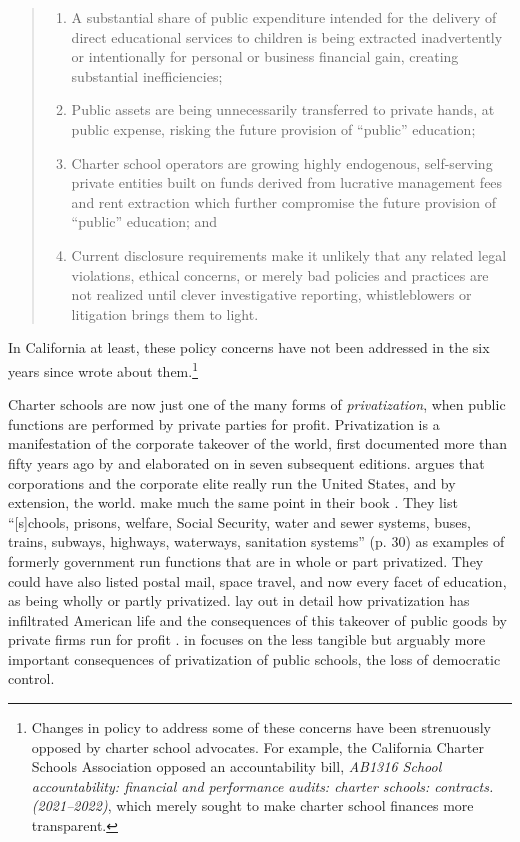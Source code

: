 \begin{quote}\OnehalfSpacing%
  \begin{enumerate}
    \item A substantial share of public expenditure intended for the delivery of direct educational services to children is being extracted inadvertently or intentionally for personal or business financial gain, creating substantial inefficiencies;
    \item Public assets are being unnecessarily transferred to private hands, at public expense, risking the future provision of “public” education;
    \item Charter school operators are growing highly endogenous, self-serving private entities built on funds derived from lucrative management fees and rent extraction which further compromise the future provision of “public” education; and
    \item Current disclosure requirements make it unlikely that any related legal violations, ethical concerns, or merely bad policies and practices are not realized until clever investigative reporting, whistleblowers or litigation brings them to light.
  \end{enumerate} 
\end{quote}

In California at least, these policy concerns have not been addressed in the six years since \citeauthor{Baker.Miron2015} wrote about them.\footnote{Changes in policy to address some of these concerns have been strenuously opposed by charter school advocates. For example, the California Charter Schools Association opposed an accountability bill, \textit{AB1316 School accountability: financial and performance audits: charter schools: contracts. (2021–2022)}, which merely sought to make charter school finances more transparent.}

Charter schools are now just one of the many forms of \textit{privatization}, when public functions are performed by private parties for profit. Privatization is a manifestation of the corporate takeover of the world, first documented more than fifty years ago by \citeauthor{Domhoff2014} and elaborated on in seven subsequent editions. \citeauthor{Domhoff2014} argues that corporations and the corporate elite really run the United States, and by extension, the world. \textcite{Kahn.Minnich2005} make much the same point in their book  \parencite{Kahn.Minnich2005}. They list ``[s]chools, prisons, welfare, Social Security, water and sewer systems, buses, trains, subways, highways, waterways, sanitation systems'' (p. 30) as examples of formerly government run functions that are in whole or part privatized. They could have also listed postal mail, space travel, and now every facet of education, as being wholly or partly privatized. \textcite{Cohen.Mikaelian2021} lay out in detail how privatization has infiltrated American life and the consequences of this takeover of public goods by private firms run for profit  \parencite{Cohen.Mikaelian2021}. \citeauthor{Black2020} in  \parencite{Black2020} focuses on the less tangible but arguably more important consequences of privatization of public schools, the loss of democratic control.

